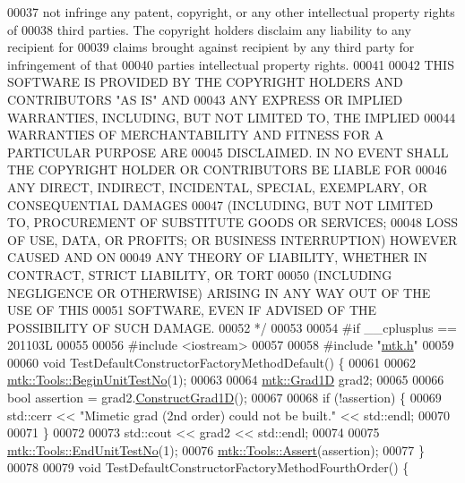 \begin{DoxyCode}
00037 \textcolor{comment}{not infringe any patent, copyright, or any other intellectual property rights of}
00038 \textcolor{comment}{third parties. The copyright holders disclaim any liability to any recipient for}
00039 \textcolor{comment}{claims brought against recipient by any third party for infringement of that}
00040 \textcolor{comment}{parties intellectual property rights.}
00041 \textcolor{comment}{}
00042 \textcolor{comment}{THIS SOFTWARE IS PROVIDED BY THE COPYRIGHT HOLDERS AND CONTRIBUTORS "AS IS" AND}
00043 \textcolor{comment}{ANY EXPRESS OR IMPLIED WARRANTIES, INCLUDING, BUT NOT LIMITED TO, THE IMPLIED}
00044 \textcolor{comment}{WARRANTIES OF MERCHANTABILITY AND FITNESS FOR A PARTICULAR PURPOSE ARE}
00045 \textcolor{comment}{DISCLAIMED. IN NO EVENT SHALL THE COPYRIGHT HOLDER OR CONTRIBUTORS BE LIABLE FOR}
00046 \textcolor{comment}{ANY DIRECT, INDIRECT, INCIDENTAL, SPECIAL, EXEMPLARY, OR CONSEQUENTIAL DAMAGES}
00047 \textcolor{comment}{(INCLUDING, BUT NOT LIMITED TO, PROCUREMENT OF SUBSTITUTE GOODS OR SERVICES;}
00048 \textcolor{comment}{LOSS OF USE, DATA, OR PROFITS; OR BUSINESS INTERRUPTION) HOWEVER CAUSED AND ON}
00049 \textcolor{comment}{ANY THEORY OF LIABILITY, WHETHER IN CONTRACT, STRICT LIABILITY, OR TORT}
00050 \textcolor{comment}{(INCLUDING NEGLIGENCE OR OTHERWISE) ARISING IN ANY WAY OUT OF THE USE OF THIS}
00051 \textcolor{comment}{SOFTWARE, EVEN IF ADVISED OF THE POSSIBILITY OF SUCH DAMAGE.}
00052 \textcolor{comment}{*/}
00053 
00054 \textcolor{preprocessor}{#if \_\_cplusplus == 201103L}
00055 
00056 \textcolor{preprocessor}{#include <iostream>}
00057 
00058 \textcolor{preprocessor}{#include "\hyperlink{mtk_8h}{mtk.h}"}
00059 
00060 \textcolor{keywordtype}{void} TestDefaultConstructorFactoryMethodDefault() \{
00061 
00062   \hyperlink{classmtk_1_1Tools_afc29ecaf337a13ed2e817d3890a5a441}{mtk::Tools::BeginUnitTestNo}(1);
00063 
00064   \hyperlink{classmtk_1_1Grad1D}{mtk::Grad1D} grad2;
00065 
00066   \textcolor{keywordtype}{bool} assertion = grad2.\hyperlink{classmtk_1_1Grad1D_a74ef5245cfae6fd158bd7f563a0c2e52}{ConstructGrad1D}();
00067 
00068   \textcolor{keywordflow}{if} (!assertion) \{
00069     std::cerr << \textcolor{stringliteral}{"Mimetic grad (2nd order) could not be built."} << std::endl;
00070 
00071   \}
00072 
00073   std::cout << grad2 << std::endl;
00074 
00075   \hyperlink{classmtk_1_1Tools_aba67d9dc35c9c1c49430fcc9ea035e03}{mtk::Tools::EndUnitTestNo}(1);
00076   \hyperlink{classmtk_1_1Tools_ac6804df469c94ab6a796fb64f1e44a89}{mtk::Tools::Assert}(assertion);
00077 \}
00078 
00079 \textcolor{keywordtype}{void} TestDefaultConstructorFactoryMethodFourthOrder() \{

\end{DoxyCode}
